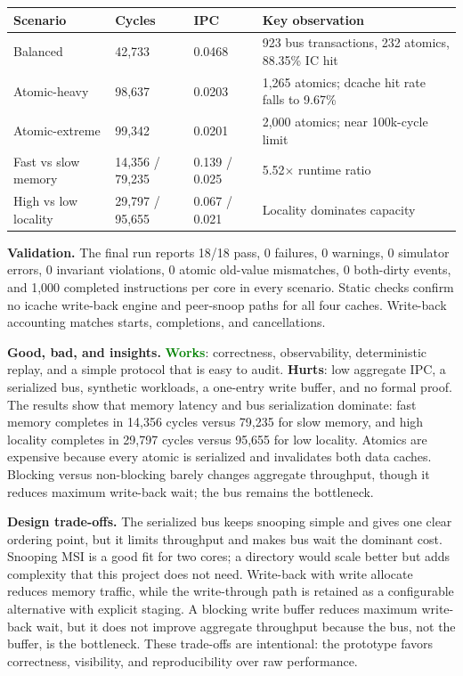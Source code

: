 \documentclass[11pt,a4paper]{article}
\newcommand{\good}{\textcolor{green}{\textbf{Works}}}
\newcommand{\bad}{\textcolor{accent}{\textbf{Hurts}}}
\begin{document}
\begin{center}
\small
\begin{tabularx}{\textwidth}{@{}p{}p{}p{}X@{}}
\toprule
\textbf{Scenario} & \textbf{Cycles} & \textbf{IPC} & \textbf{Key observation} \\
\midrule
Balanced & 42,733 & 0.0468 & 923 bus transactions, 232 atomics, 88.35\% IC hit \\
Atomic-heavy & 98,637 & 0.0203 & 1,265 atomics; dcache hit rate falls to 9.67\% \\
Atomic-extreme & 99,342 & 0.0201 & 2,000 atomics; near 100k-cycle limit \\
Fast vs slow memory & 14,356 / 79,235 & 0.139 / 0.025 & 5.52$\times$ runtime ratio \\
High vs low locality & 29,797 / 95,655 & 0.067 / 0.021 & Locality dominates capacity \\
\bottomrule
\end{tabularx}
\end{center}

\textbf{Validation.} The final run reports 18/18 pass, 0 failures, 0 warnings, 0 simulator
errors, 0 invariant violations, 0 atomic old-value mismatches, 0 both-dirty events, and
1,000 completed instructions per core in every scenario. Static checks confirm no icache
write-back engine and peer-snoop paths for all four caches. Write-back accounting matches
starts, completions, and cancellations.

\textbf{Good, bad, and insights.} \good: correctness, observability, deterministic
replay, and a simple protocol that is easy to audit. \bad: low aggregate IPC, a serialized
bus, synthetic workloads, a one-entry write buffer, and no formal proof. The results show
that memory latency and bus serialization dominate: fast memory completes in 14,356 cycles
versus 79,235 for slow memory, and high locality completes in 29,797 cycles versus 95,655
for low locality. Atomics are expensive because every atomic is serialized and invalidates
both data caches. Blocking versus non-blocking barely changes aggregate throughput, though
it reduces maximum write-back wait; the bus remains the bottleneck.

\textbf{Design trade-offs.} The serialized bus keeps snooping simple and gives one clear
ordering point, but it limits throughput and makes bus wait the dominant cost. Snooping
MSI is a good fit for two cores; a directory would scale better but adds complexity that
this project does not need. Write-back with write allocate reduces memory traffic, while
the write-through path is retained as a configurable alternative with explicit staging.
A blocking write buffer reduces maximum write-back wait, but it does not improve aggregate
throughput because the bus, not the buffer, is the bottleneck. These trade-offs are
intentional: the prototype favors correctness, visibility, and reproducibility over raw
performance.
\end{document}
